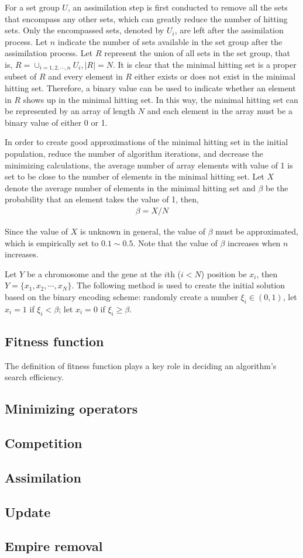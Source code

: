For a set group $U$, an assimilation step is first conducted to remove all the sets that encompass any other sets, which can greatly reduce the number of hitting sets.
Only the encompassed sets, denoted by $U_i$, are left after the assimilation process. 
Let $n$ indicate the number of sets available in the set group after the assimilation process.
Let $R$ represent the union of all sets in the set group, that is, $R = \cup_{i = 1, 2, \cdots, n}U_i, |R| = N$.
It is clear that the minimal hitting set is a proper subset of $R$ and every element in $R$ either exists or does not exist in the minimal hitting set.
Therefore, a binary value can be used to indicate whether an element in $R$ shows up in the minimal hitting set.
In this way, the minimal hitting set can be represented by an array of length $N$ and each element in the array must be a binary value of either 0 or 1.

In order to create good approximations of the minimal hitting set in the initial population, reduce the number of algorithm iterations, and decrease the minimizing calculations, the average number of array elements with value of 1 is set to be close to the number of elements in the minimal hitting set.
Let $X$ denote the average number of elements in the minimal hitting set and $\beta$ be the probability that an element takes the value of 1, then,
\begin{align}
	\beta = X / N
\end{align}

Since the value of $X$ is unknown in general, the value of $\beta$ must be approximated, which is empirically set to $0.1 \sim 0.5$.
Note that the value of $\beta$ increases when $n$ increases.

Let $Y$ be a chromosome and the gene at the $i$th ($i < N$) position be $x_i$, then $Y = \{x_1, x_2, \cdots, x_N\}$.
The following method is used to create the initial solution based on the binary encoding scheme:
randomly create a number $\xi_i \in (0, 1)$, let $x_i = 1$ if $\xi_i < \beta$; let $x_i = 0$ if $\xi_i \geq \beta$.

\subsection{Fitness function}
The definition of fitness function plays a key role in deciding an algorithm's search efficiency.



\subsection{Minimizing operators}



\subsection{Competition}


\subsection{Assimilation}


\subsection{Update}


\subsection{Empire removal}